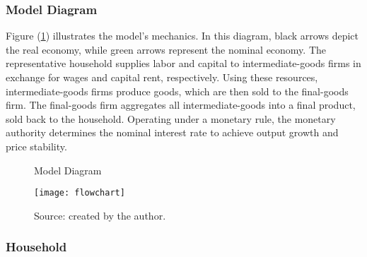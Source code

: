 \documentclass[../thesis.tex]{subfiles}
\begin{document}


\subsubsection*{Model Diagram}


Figure (\ref{fig_v6:model-diagram}) illustrates the model's mechanics. In this diagram, black arrows depict the real economy, while green arrows represent the nominal economy. The representative household supplies labor and capital to intermediate-goods firms in exchange for wages and capital rent, respectively. Using these resources, intermediate-goods firms produce goods, which are then sold to the final-goods firm. The final-goods firm aggregates all intermediate-goods into a final product, sold back to the household. Operating under a monetary rule, the monetary authority determines the nominal interest rate to achieve output growth and price stability.

\begin{figure}[p!]
	\centering
	\caption{Model Diagram}
	\texttt{[image: flowchart]}
	\caption*{Source: created by the author.}
	\label{fig_v6:model-diagram}
\end{figure}	
	


\newpage

\subsubsection{Household}
\end{document}
